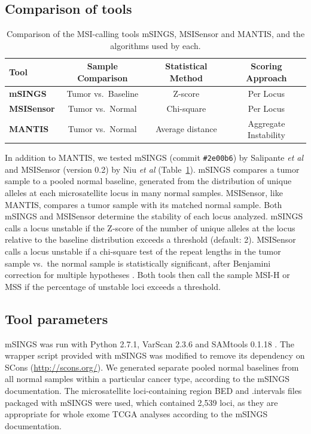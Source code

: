 \subsection{Comparison of tools}
\begin{table}[H]
	\begin{center}
		\begin{tabular}{l|c|c|c}
			\textbf{Tool} & \textbf{Sample Comparison} & \textbf{Statistical Method} & \textbf{Scoring Approach} \\
			\hline
			\textbf{mSINGS} & Tumor vs.\ Baseline & Z-score & Per Locus \\
			\textbf{MSISensor} & Tumor vs.\ Normal & Chi-square & Per Locus \\
			\textbf{MANTIS} & Tumor vs.\ Normal & Average distance & Aggregate Instability
		\end{tabular}
	\end{center}
	\vspace{-0.3cm}
	\caption[Comparison of the MSI-calling tools mSINGS, MSISensor and MANTIS.]{Comparison of the MSI-calling tools mSINGS, MSISensor and MANTIS, and the algorithms used by each.}
	\label{table:msilandscape:tool_comparison}
\end{table}
In addition to MANTIS, we tested mSINGS (commit \verb|#2e00b6|) by Salipante \textit{et al} \cite{salipante2014} and MSISensor (version 0.2) by Niu \textit{et al} \cite{niu2013} (Table~\ref{table:msilandscape:tool_comparison}). mSINGS compares a tumor sample to a pooled normal baseline, generated from the distribution of unique alleles at each microsatellite locus in many normal samples. MSISensor, like MANTIS, compares a tumor sample with its matched normal sample. Both mSINGS and MSISensor determine the stability of each locus analyzed. mSINGS calls a locus unstable if the Z-score of the number of unique alleles at the locus relative to the baseline distribution exceeds a threshold (default: 2). MSISensor calls a locus unstable if a chi-square test of the repeat lengths in the tumor sample vs.\ the normal sample is statistically significant, after Benjamini correction for multiple hypotheses \cite{benjamini1995}. Both tools then call the sample MSI-H or MSS if the percentage of unstable loci exceeds a threshold.

\subsection{Tool parameters}
\label{ssec:msilandscape:tool_params}
mSINGS was run with Python 2.7.1, VarScan 2.3.6 \cite{varscan2} and SAMtools 0.1.18 \cite{samtools}. The wrapper script provided with mSINGS was modified to remove its dependency on SCons (\url{http://scons.org/}). We generated separate pooled normal baselines from all normal samples within a particular cancer type, according to the mSINGS documentation. The microsatellite loci-containing region BED and .intervals files packaged with mSINGS were used, which contained 2,539 loci, as they are appropriate for whole exome TCGA analyses according to the mSINGS documentation.

